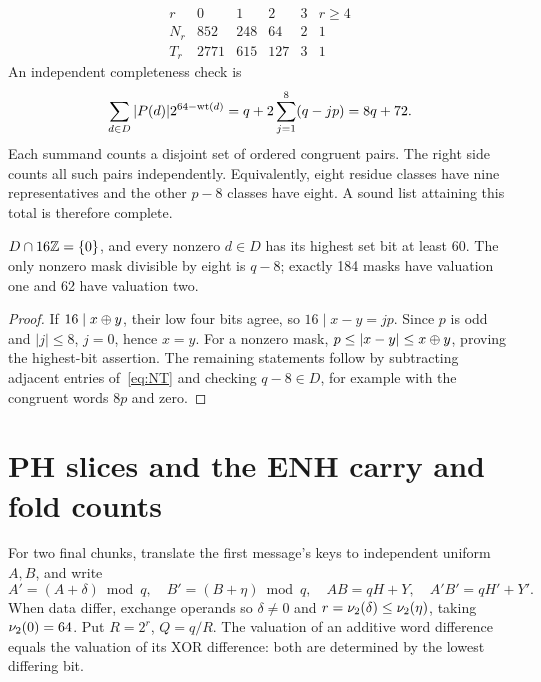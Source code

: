 \begin{equation}\label{eq:NT}
\begin{array}{c|rrrrr}
r&0&1&2&3& r\ge4\\\hline
N_r&852&248&64&2&1\\
T_r&2771&615&127&3&1
\end{array}
\end{equation}
An independent completeness check is
\begin{equation}\label{eq:mass}
 \sum_{d\in D}|P(d)|2^{64-\operatorname{wt}(d)}
 =q+2\sum_{j=1}^8(q-jp)=8q+72.
\end{equation}
Each summand counts a disjoint set of ordered congruent pairs. The right side counts all such pairs independently. Equivalently, eight residue classes have nine representatives and the other $p-8$ classes have eight. A sound list attaining this total is therefore complete.

\begin{lemma}\label{lem:16}
$D\cap16\mathbb Z=\{0\}$, and every nonzero $d\in D$ has its highest set bit at least 60. The only nonzero mask divisible by eight is $q-8$; exactly 184 masks have valuation one and 62 have valuation two.
\end{lemma}
\begin{proof}
If $16\mid x\mathbin\oplus y$, their low four bits agree, so $16\mid x-y=jp$. Since $p$ is odd and $|j|\le8$, $j=0$, hence $x=y$. For a nonzero mask, $p\le|x-y|\le x\mathbin\oplus y$, proving the highest-bit assertion. The remaining statements follow by subtracting adjacent entries of~\eqref{eq:NT} and checking $q-8\in D$, for example with the congruent words $8p$ and zero.
\end{proof}

\section{PH slices and the ENH carry and fold counts}\label{sec:basic}
For two final chunks, translate the first message's keys to independent uniform $A,B$, and write
\[
 A'=(A+\delta)\bmod q,\quad B'=(B+\eta)\bmod q,\quad
 AB=qH+Y,\quad A'B'=qH'+Y'.
\]
When data differ, exchange operands so $\delta\ne0$ and $r=\nu_2(\delta)\le\nu_2(\eta)$, taking $\nu_2(0)=64$. Put $R=2^r$, $Q=q/R$. The valuation of an additive word difference equals the valuation of its XOR difference: both are determined by the lowest differing bit.

